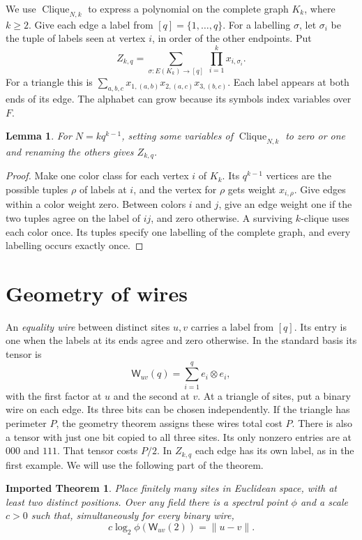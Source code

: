 \documentclass[11pt,letterpaper]{article}
\newtheorem{lemma}[theorem]{Lemma}
\theoremstyle{importstyle}
\newtheorem{imported}{Imported Theorem}
\newcommand{\F}{F}
\newcommand{\Clique}{\operatorname{Clique}}
\newcommand{\wire}{\mathsf W}
\newcommand{\norm}[1]{\lVert#1\rVert}
\begin{document}
We use \(\Clique_{N,k}\) to express a polynomial on the complete graph \(K_k\),
where \(k\ge2\). Give each edge a label from \([q]=\{1,\ldots,q\}\).
For a labelling \(\sigma\), let \(\sigma_i\) be the tuple of labels
seen at vertex \(i\), in order of the other endpoints. Put
\[
      Z_{k,q}=\sum_{\sigma:E(K_k)\to[q]}\ \prod_{i=1}^k x_{i,\sigma_i}.
\]
For a triangle this is \(\sum_{a,b,c}x_{1,(a,b)}x_{2,(a,c)}x_{3,(b,c)}\).
Each label appears at both ends of its edge. The alphabet can grow
because its symbols index variables over \(\F\).

\begin{lemma}\label{lem:colors}
For \(N=kq^{k-1}\), setting some variables of \(\Clique_{N,k}\) to zero
or one and renaming the others gives \(Z_{k,q}\).
\end{lemma}
\begin{proof}
Make one color class for each vertex \(i\) of \(K_k\). Its \(q^{k-1}\)
vertices are the possible tuples \(\rho\) of labels at \(i\), and the
vertex for \(\rho\) gets weight \(x_{i,\rho}\). Give edges within a color
weight zero. Between colors \(i\) and \(j\), give an edge weight one
if the two tuples agree on the label of \(ij\), and zero otherwise.
A surviving \(k\)-clique uses each color once. Its tuples specify one
labelling of the complete graph, and every labelling occurs exactly once.
\end{proof}

\section{Geometry of wires}
\label{sec:prices}

An \emph{equality wire} between distinct sites \(u,v\) carries a label
from \([q]\). Its entry is one when the labels at its ends agree and zero
otherwise. In the standard basis its tensor is
\[
   \wire_{uv}(q)=\sum_{i=1}^q e_i\otimes e_i,
\]
with the first factor at \(u\) and the second at \(v\).
At a triangle of sites, put a binary wire on each edge. Its three bits
can be chosen independently. If the triangle has perimeter \(P\), the
geometry theorem assigns these wires total cost \(P\). There is also a
tensor with just one bit copied to all three sites. Its only nonzero
entries are at \(000\) and \(111\). That tensor costs \(P/2\). In
\(Z_{k,q}\) each edge has its own label, as in the first example. We
will use the following part of the theorem.

\begin{importbox}
\begin{imported}\label{imp:geometry}
Place finitely many sites in Euclidean space, with at least two distinct
positions. Over any field there is a spectral point \(\phi\) and a scale
\(c>0\) such that, simultaneously for every binary wire,
\[
        c\log_2\phi(\wire_{uv}(2))=\norm{u-v}.
\]
\end{imported}
\end{importbox}
\end{document}
